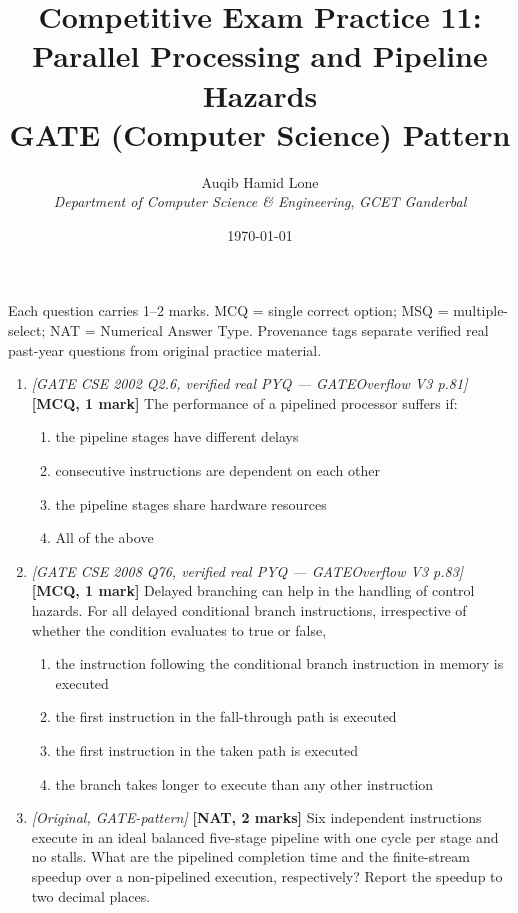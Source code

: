 \documentclass[11pt]{article}
\title{Competitive Exam Practice 11: Parallel Processing and Pipeline Hazards\\
  \large GATE (Computer Science) Pattern}
\author{Auqib Hamid Lone\\[0.3em]
  \emph{Department of Computer Science \& Engineering}, \emph{GCET Ganderbal}}
\date{\today}
\begin{document}
\maketitle

\noindent Each question carries 1--2 marks. MCQ = single correct option;
MSQ = multiple-select; NAT = Numerical Answer Type. Provenance tags separate
verified real past-year questions from original practice material.

\begin{enumerate}
\item[\textbf{Q1}] \textit{[GATE CSE 2002 Q2.6, verified real PYQ ---
GATEOverflow V3 p.81]} \textbf{[MCQ, 1 mark]} The performance of a pipelined
processor suffers if:
\begin{enumerate}
  \item[(A)] the pipeline stages have different delays
  \item[(B)] consecutive instructions are dependent on each other
  \item[(C)] the pipeline stages share hardware resources
  \item[(D)] All of the above
\end{enumerate}

\item[\textbf{Q2}] \textit{[GATE CSE 2008 Q76, verified real PYQ ---
GATEOverflow V3 p.83]} \textbf{[MCQ, 1 mark]} Delayed branching can help in
the handling of control hazards. For all delayed conditional branch
instructions, irrespective of whether the condition evaluates to true or
false,
\begin{enumerate}
  \item[(A)] the instruction following the conditional branch instruction in
  memory is executed
  \item[(B)] the first instruction in the fall-through path is executed
  \item[(C)] the first instruction in the taken path is executed
  \item[(D)] the branch takes longer to execute than any other instruction
\end{enumerate}

\item[\textbf{Q3}] \textit{[Original, GATE-pattern]} \textbf{[NAT, 2 marks]}
Six independent instructions execute in an ideal balanced five-stage pipeline
with one cycle per stage and no stalls. What are the pipelined completion time
and the finite-stream speedup over a non-pipelined execution, respectively?
Report the speedup to two decimal places.


\end{enumerate}
\end{document}
